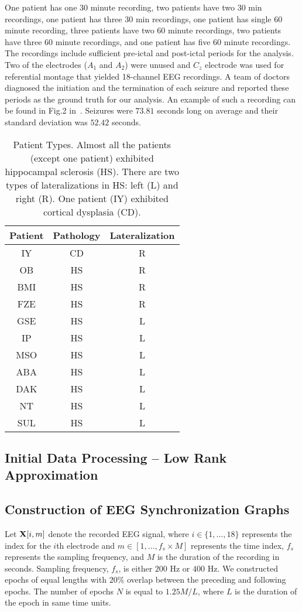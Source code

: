 \documentclass{article} %
\begin{document}
One patient has one $30$ minute recording, two patients have two $30$ min recordings, one patient has three $30$ min recordings, one 
patient has single $60$ minute recording, three patients have two $60$ minute recordings, two patients have three $60$ minute recordings, and one patient has five $60$ minute recordings.  The recordings include sufficient \mbox{pre-ictal} and \mbox{post-ictal} periods for the  analysis. Two of the electrodes ($A_1$  and $A_2$) were unused and  $C_z$ electrode was used for referential montage that yielded \mbox{18-channel} EEG
recordings.  A team of doctors diagnosed the initiation and the termination of each seizure and reported these periods as the ground truth for our
analysis.  An example of such a recording can be found in Fig.2 in~\cite{smith_eegrecording}.  Seizures were $73.81$ seconds long on average and their standard deviation was $52.42$ seconds.
\begin{table}[htdp]
\caption{Patient Types. Almost all the patients (except one patient) exhibited hippocampal sclerosis (HS).  
There are two types of lateralizations in HS: left (L) and right (R).  One patient (IY) 
exhibited cortical dysplasia (CD).}
\begin{center}
\begin{tabular}{ccc}
	Patient & Pathology & Lateralization\\
	\hline \hline
	IY&CD&R\\
	OB&HS&R\\
	BMI&HS&R\\
	FZE&HS&R\\
	GSE&HS&L\\
	IP&HS&L\\
	MSO	&HS&L\\	
	ABA&HS&L\\
	DAK&HS&L\\
	NT&HS&L\\
	SUL&HS&L\\
\end{tabular}
\end{center}
\label{tab:patient_types}
\end{table}

\subsection{Initial Data Processing -- Low Rank Approximation}

\subsection{Construction of EEG Synchronization Graphs} \label{sec:graph_construct}
Let ${\bf X}[i,m]$ denote the recorded EEG signal, where $i\in\{1,\ldots,18\}$ represents the index for the $i$th electrode and $m\in\left[1,\ldots,f_s\times M\right]$ represents the time index, $f_s$ represents the sampling frequency, and $M$ is the duration of the recording in seconds.  Sampling frequency, $f_s$, is either $200$ Hz or $400$ Hz.  We constructed epochs of equal lengths with $20\%$ overlap between the  preceding and following epochs.  The number of epochs $N$ is equal to $1.25M/L$, where $L$ is the duration of the epoch in same time units.
\end{document}
